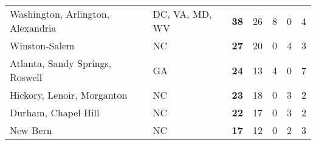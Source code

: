 \begin{tabular*}{\textwidth}{@{\extracolsep{\fill} } llccccc}
\hspace{0.2cm}Washington, Arlington, Alexandria&DC, VA, MD, WV&\bfseries 38&26&8&0&4\\%
\hspace{0.2cm}Winston-Salem&NC&\bfseries 27&20&0&4&3\\%
\hspace{0.2cm}Atlanta, Sandy Springs, Roswell&GA&\bfseries 24&13&4&0&7\\%
\hspace{0.2cm}Hickory, Lenoir, Morganton&NC&\bfseries 23&18&0&3&2\\%
\hspace{0.2cm}Durham, Chapel Hill&NC&\bfseries 22&17&0&3&2\\%
\hspace{0.2cm}New Bern&NC&\bfseries 17&12&0&2&3\\%
\hline%
\end{tabular*}